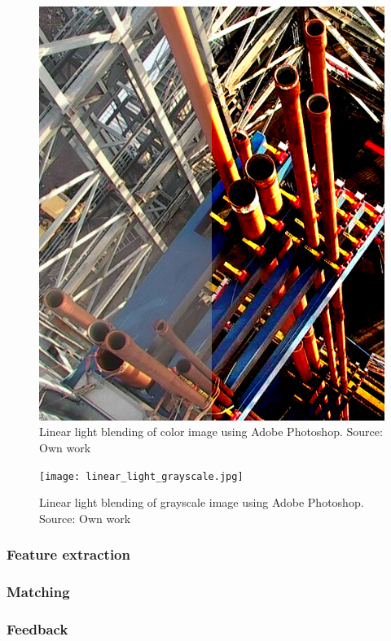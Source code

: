 \begin{figure}[ht]
    \centering
    \includegraphics[width=1.0\textwidth]{linear_light.jpg}
    \caption{Linear light blending of color image using Adobe Photoshop. Source: Own work}
    \label{fig:linear_light}
\end{figure}
\FloatBarrier
\begin{figure}[ht]
    \centering
    \texttt{[image: linear\_light\_grayscale.jpg]}
    \caption{Linear light blending of grayscale image using Adobe Photoshop. Source: Own work}
    \label{fig:linear_light_grayscale}
\end{figure}
\FloatBarrier

\subsubsection{Feature extraction}

\subsubsection{Matching}

\subsubsection{Feedback}